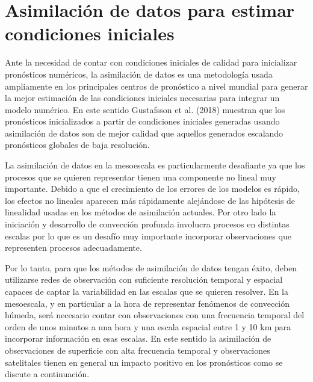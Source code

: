 \documentclass[12pt,oneside,a4paper]{reedthesis}
\begin{document}
\hypertarget{asimilaciuxf3n-de-datos-para-estimar-condiciones-iniciales}{%
\section{Asimilación de datos para estimar condiciones iniciales}\label{asimilaciuxf3n-de-datos-para-estimar-condiciones-iniciales}}

Ante la necesidad de contar con condiciones iniciales de calidad para inicializar pronósticos numéricos, la asimilación de datos es una metodología usada ampliamente en los principales centros de pronóstico a nivel mundial para generar la mejor estimación de las condiciones iniciales necesarias para integrar un modelo numérico. En este sentido Gustafsson et al. (2018) muestran que los pronósticos inicializados a partir de condiciones iniciales generadas usando asimilación de datos son de mejor calidad que aquellos generados escalando pronósticos globales de baja resolución.

La asimilación de datos en la mesoescala es particularmente desafiante ya que los procesos que se quieren representar tienen una componente no lineal muy importante. Debido a que el crecimiento de los errores de los modelos es rápido, los efectos no lineales aparecen más rápidamente alejándose de las hipótesis de linealidad usadas en los métodos de asimilación actuales. Por otro lado la iniciación y desarrollo de convección profunda involucra procesos en distintas escalas por lo que es un desafío muy importante incorporar observaciones que representen procesos adecuadamente.

Por lo tanto, para que los métodos de asimilación de datos tengan éxito, deben utilizarse redes de observación con suficiente resolución temporal y espacial capaces de captar la variabilidad en las escalas que se quieren resolver. En la mesoescala, y en particular a la hora de representar fenómenos de convección húmeda, será necesario contar con observaciones con una frecuencia temporal del orden de unos minutos a una hora y una escala espacial entre 1 y 10 km para incorporar información en esas escalas. En este sentido la asimilación de observaciones de superficie con alta frecuencia temporal y observaciones satelitales tienen en general un impacto positivo en los pronósticos como se discute a continuación.
\end{document}
